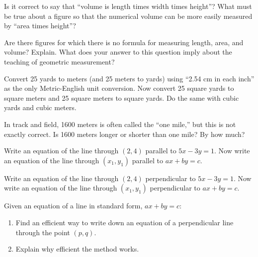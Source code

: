 \begin{prob}
 Is it correct to say that ``volume is length times width times height''? What must be true about a figure so that the numerical volume can be more easily measured by ``area times height''?
\end{prob}

\begin{prob}
Are there figures for which there is no formula for measuring length, area, and volume?  Explain.  What does your answer to this question imply about the teaching of geometric measurement?
\end{prob}

\begin{prob}
Convert 25 yards to meters (and 25 meters to yards) using ``2.54 cm in each inch'' as the only Metric-English unit conversion.  Now convert 25 square yards to square meters and 25 square meters to square yards.  Do the same with cubic yards and cubic meters.
\end{prob}

\begin{prob}
In track and field, 1600 meters is often called the ``one mile,'' but this is not exactly correct.  Is 1600 meters longer or shorter than one mile?  By how much?  
\end{prob}


\begin{prob}
Write an equation of the line through $(2,4)$ parallel to $5x-3y=1$.  
Now write an equation of the line through $(x_1,y_1)$ parallel to $ax+by=c$. 
\end{prob}

\begin{prob}
Write an equation of the line through $(2,4)$ perpendicular to $5x-3y=1$.  
Now write an equation of the line through $(x_1,y_1)$ perpendicular to $ax+by=c$. 
\end{prob}

\begin{prob}
Given an equation of a line in standard form, $ax+by=c$:  
\begin{enumerate}
\item Find an efficient way to write down an equation of a perpendicular line through the point $(p,q)$.  
\item Explain why efficient the method works. 
\end{enumerate}
\end{prob}


